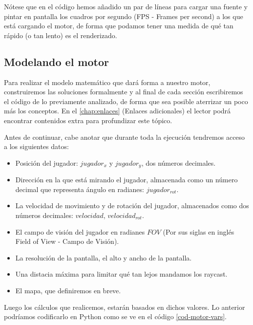 Nótese que en el código hemos añadido un par de líneas para cargar una fuente y pintar en pantalla los cuadros por segundo (FPS - Frames per second) a los que está cargando el motor, de forma que podamos tener una medida de qué tan rápido (o tan lento) es el renderizado.



\subsection{Modelando el motor}

Para realizar el modelo matemático que dará forma a nuestro motor, construiremos las soluciones formalmente y al final de cada sección escribiremos el código de lo previamente analizado, de forma que sea posible aterrizar un poco más los conceptos. En el \autoref{chap:enlaces} (Enlaces adicionales) el lector podrá encontrar contenidos extra para profundizar este tópico.

Antes de continuar, cabe anotar que durante toda la ejecución tendremos acceso a los siguientes datos:

\begin{itemize}
	\item Posición del jugador: $jugador_x$ y $jugador_y$, dos números decimales.
	\item Dirección en la que está mirando el jugador, almacenada como un número decimal que representa ángulo en radianes: $jugador_{rot}$.
	\item La velocidad de movimiento y de rotación del jugador, almacenados como dos números decimales: $velocidad$,  $velocidad_{rot}$. 
	\item El campo de visión del jugador en radianes $FOV$ (Por sus siglas en inglés Field of View - Campo de Visión).
	\item La resolución de la pantalla, el alto y ancho de la pantalla.
	\item Una distacia máxima para limitar qué tan lejos mandamos los raycast.
	\item El mapa, que definiremos en breve.
\end{itemize}

Luego los cálculos que realicemos, estarán basados en dichos valores. Lo anterior podríamos codificarlo en Python como se ve en el código \ref{cod-motor-vars}.


